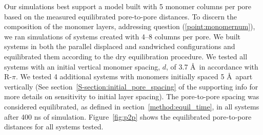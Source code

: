 \documentclass[journal=jpcbfk,manusciprt=article]{achemso}
\begin{document}
%  
  
  Our simulations best support a model built with 5 monomer columns per pore based on
  the measured equilibrated pore-to-pore distances. To discern the composition of
  the monomer layers, addressing question (\ref{point:monomernum}), we ran
  simulations of systems created with 4--8 columns per pore. We built systems in both
  the parallel displaced and sandwiched configurations and equilibrated them according
  to the dry equilibration procedure. We tested all systems with an initial vertical monomer 
  spacing, $\mathit{d}$, of 3.7 \AA~in accordance with R-$\pi$. We tested 4 additional systems with
  monomers initially spaced 5 \AA~apart vertically (See section~\ref{S-section:initial_pore_spacing}
  of the supporting info for more details on sensitivity to initial layer spacing). 
  The pore-to-pore spacing was considered equilibrated, as defined in section~\ref{method:equil_time},
  in all systems after 400 ns of simulation. Figure~\ref{fig:p2p} shows the equilibrated
  pore-to-pore distances for all systems tested. 
  
\end{document}
